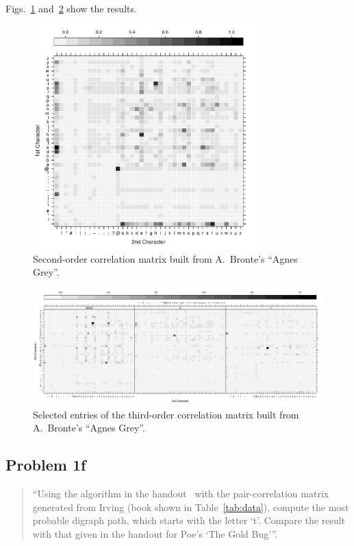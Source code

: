\documentclass[conference]{IEEEtran}
\begin{document}
Figs.~\ref{fig:agnes_grey_2nd_order} and~\ref{fig:agnes_grey_3rd_order} show the results.

\begin{figure}[!t]
\centering
\includegraphics[width=3.4in]{agnes_grey_2nd_order}
\caption{Second-order correlation matrix built from A.~Bronte's ``Agnes Grey''.}
\label{fig:agnes_grey_2nd_order}
\end{figure}

\begin{figure}[!t]
\centering
\includegraphics[width=\textwidth]{agnes_grey_3rd_order}
\caption{Selected entries of the third-order correlation matrix built from 
A.~Bronte's ``Agnes Grey''.}
\label{fig:agnes_grey_3rd_order}
\end{figure}


\subsection{Problem 1f}
\label{sec:problem1f}

\begin{quote}
``Using the algorithm in the handout~\cite{Bennett1976} with the pair-correlation matrix 
generated from Irving (book shown in Table~\ref{tab:data}), compute the most 
probable digraph path, which starts with the letter `t'. Compare the result with 
that given in the handout for Poe's `The Gold Bug'''.
\end{quote}
\end{document}
